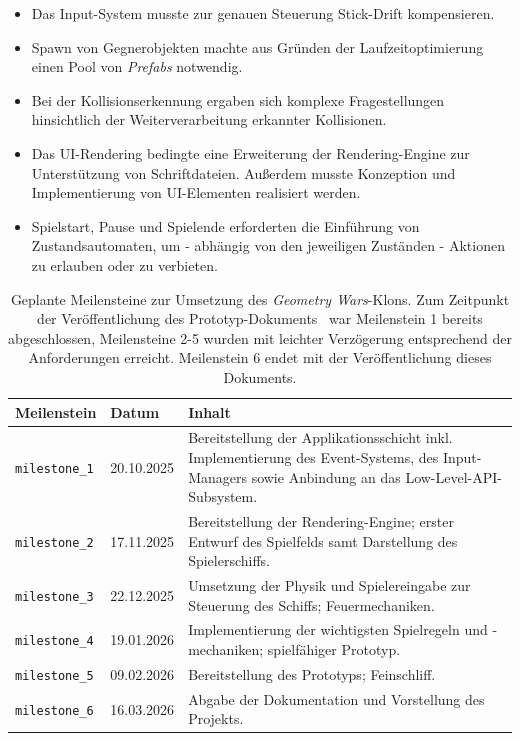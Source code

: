 \begin{itemize}
    \itemsep0.5em
    \item Das Input-System musste zur genauen Steuerung Stick-Drift kompensieren.
    \item Spawn von Gegnerobjekten machte aus Gründen der Laufzeitoptimierung einen Pool von \textit{Prefabs} notwendig.
    \item Bei der Kollisionserkennung ergaben sich komplexe Fragestellungen hinsichtlich der Weiterverarbeitung erkannter Kollisionen.
    \item Das UI-Rendering bedingte eine Erweiterung der Rendering-Engine zur Unterstützung von Schriftdateien.
    Außerdem musste Konzeption und Implementierung von UI-Elementen realisiert werden.
    \item Spielstart, Pause und Spielende erforderten die Einführung von Zustandsautomaten, um - abhängig von den jeweiligen Zuständen - Aktionen zu erlauben oder zu verbieten.
\end{itemize}

\setlength{\tabcolsep}{8pt}
\begin{table}[t]
    \centering
    {\renewcommand{\arraystretch}{1.2}%
        \begin{tabularx}{\textwidth}{@{} l l Y @{}}
        \toprule
        \textbf{Meilenstein} & \textbf{Datum} & \textbf{Inhalt} \\
        \midrule
        \texttt{milestone\_1} & 20.10.2025 &
        Bereitstellung der Applikationsschicht inkl. Implementierung des Event-Systems,
        des Input-Managers sowie Anbindung an das Low-Level-API-Subsystem. \\
        \texttt{milestone\_2} & 17.11.2025 &
        Bereitstellung der Rendering-Engine; erster Entwurf des Spielfelds samt Darstellung des Spielerschiffs. \\
        \texttt{milestone\_3} & 22.12.2025 &
        Umsetzung der Physik und Spielereingabe zur Steuerung des Schiffs; Feuermechaniken. \\
        \texttt{milestone\_4} & 19.01.2026 &
        Implementierung der wichtigsten Spielregeln und -mechaniken; spielfähiger Prototyp. \\
        \texttt{milestone\_5} & 09.02.2026 &
        Bereitstellung des Prototyps; Feinschliff. \\
        \texttt{milestone\_6} & 16.03.2026 &
        Abgabe der Dokumentation und Vorstellung des Projekts. \\
        \bottomrule
        \end{tabularx}}
    \caption{Geplante Meilensteine zur Umsetzung des \textit{Geometry Wars}-Klons.
    Zum Zeitpunkt der Veröffentlichung des Prototyp-Dokuments~\cite{SH25} war Meilenstein 1 bereits abgeschlossen, Meilensteine 2-5 wurden mit leichter Verzögerung entsprechend der Anforderungen erreicht. Meilenstein 6 endet mit der Veröffentlichung dieses Dokuments.}
    \label{tab:zeitplan}
\end{table}
